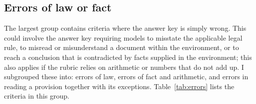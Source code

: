 \documentclass[11pt]{article}
\begin{document}
\subsection{Errors of law or fact}
\label{sec:errors}

The largest group contains criteria where the answer key is simply wrong. This could involve the answer key requiring models to misstate the applicable legal rule, to misread or misunderstand a document within the environment, or to reach a conclusion that is contradicted by facts supplied in the environment; this also applies if the rubric relies on arithmetic or numbers that do not add up. I subgrouped these into: errors of law, errors of fact and arithmetic, and errors in reading a provision together with its exceptions. Table~\ref{tab:errors} lists the criteria in this group.
\end{document}
